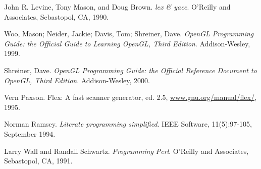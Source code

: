 \begin{thebibliography}{ABCD}
  \bibitem[]{} John R. Levine, Tony Mason, and Doug Brown. \emph{lex \& yacc}.
    O'Reilly and Associates, Sebastopol, CA, 1990.

  \bibitem[]{} Woo, Mason; Neider, Jackie; Davis, Tom; Shreiner, Dave.
    \emph{OpenGL Programming Guide: the Official Guide to Learning OpenGL, Third
      Edition}. Addison-Wesley, 1999.

  \bibitem[]{} Shreiner, Dave. \emph{OpenGL Programming Guide: the Official
    Reference Document to OpenGL, Third Edition}.  Addison-Wesley, 2000.

  \bibitem[]{} Vern Paxson. {Flex: A fast scanner generator, ed. 2.5},
    \url{www.gnu.org/manual/flex/}, 1995.

  \bibitem[]{} Norman Ramsey. \emph{Literate programming simplified}. IEEE
    Software, 11(5):97-105, September 1994.

  \bibitem[]{} Larry Wall and Randall Schwartz. \emph{Programming
    Perl}.  O'Reilly and Associates, Sebastopol, CA, 1991.

\end{thebibliography}
